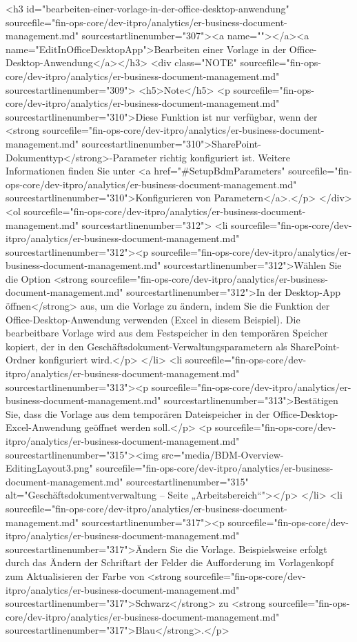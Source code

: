 <h3 id="bearbeiten-einer-vorlage-in-der-office-desktop-anwendung" sourcefile="fin-ops-core/dev-itpro/analytics/er-business-document-management.md" sourcestartlinenumber="307"><a name=""></a><a name="EditInOfficeDesktopApp">Bearbeiten einer Vorlage in der Office-Desktop-Anwendung</a></h3>
<div class="NOTE" sourcefile="fin-ops-core/dev-itpro/analytics/er-business-document-management.md" sourcestartlinenumber="309">
<h5>Note</h5>
<p sourcefile="fin-ops-core/dev-itpro/analytics/er-business-document-management.md" sourcestartlinenumber="310">Diese Funktion ist nur verfügbar, wenn der <strong sourcefile="fin-ops-core/dev-itpro/analytics/er-business-document-management.md" sourcestartlinenumber="310">SharePoint-Dokumenttyp</strong>-Parameter richtig konfiguriert ist. Weitere Informationen finden Sie unter <a href="#SetupBdmParameters" sourcefile="fin-ops-core/dev-itpro/analytics/er-business-document-management.md" sourcestartlinenumber="310">Konfigurieren von Parametern</a>.</p>
</div>
<ol sourcefile="fin-ops-core/dev-itpro/analytics/er-business-document-management.md" sourcestartlinenumber="312">
<li sourcefile="fin-ops-core/dev-itpro/analytics/er-business-document-management.md" sourcestartlinenumber="312"><p sourcefile="fin-ops-core/dev-itpro/analytics/er-business-document-management.md" sourcestartlinenumber="312">Wählen Sie die Option <strong sourcefile="fin-ops-core/dev-itpro/analytics/er-business-document-management.md" sourcestartlinenumber="312">In der Desktop-App öffnen</strong> aus, um die Vorlage zu ändern, indem Sie die Funktion der Office-Desktop-Anwendung verwenden (Excel in diesem Beispiel). Die bearbeitbare Vorlage wird aus dem Festspeicher in den temporären Speicher kopiert, der in den Geschäftsdokument-Verwaltungsparametern als SharePoint-Ordner konfiguriert wird.</p>
</li>
<li sourcefile="fin-ops-core/dev-itpro/analytics/er-business-document-management.md" sourcestartlinenumber="313"><p sourcefile="fin-ops-core/dev-itpro/analytics/er-business-document-management.md" sourcestartlinenumber="313">Bestätigen Sie, dass die Vorlage aus dem temporären Dateispeicher in der Office-Desktop-Excel-Anwendung geöffnet werden soll.</p>
<p sourcefile="fin-ops-core/dev-itpro/analytics/er-business-document-management.md" sourcestartlinenumber="315"><img src="media/BDM-Overview-EditingLayout3.png" sourcefile="fin-ops-core/dev-itpro/analytics/er-business-document-management.md" sourcestartlinenumber="315" alt="Geschäftsdokumentverwaltung – Seite „Arbeitsbereich“"></p>
</li>
<li sourcefile="fin-ops-core/dev-itpro/analytics/er-business-document-management.md" sourcestartlinenumber="317"><p sourcefile="fin-ops-core/dev-itpro/analytics/er-business-document-management.md" sourcestartlinenumber="317">Ändern Sie die Vorlage. Beispielsweise erfolgt durch das Ändern der Schriftart der Felder die Aufforderung im Vorlagenkopf zum Aktualisieren der Farbe von <strong sourcefile="fin-ops-core/dev-itpro/analytics/er-business-document-management.md" sourcestartlinenumber="317">Schwarz</strong> zu <strong sourcefile="fin-ops-core/dev-itpro/analytics/er-business-document-management.md" sourcestartlinenumber="317">Blau</strong>.</p>
